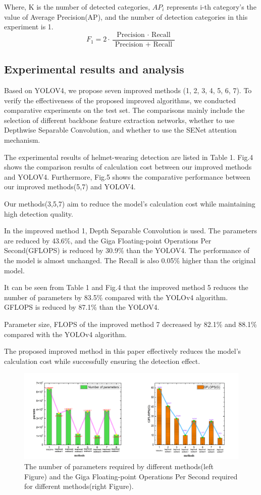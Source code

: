 \documentclass[journal]{IEEEtran}
\begin{document}
   Where, K is the number of detected categories,  $AP_{i}$ represents i-th category's the value of Average Precision(AP), and the number of detection categories in this experiment is 1.
\begin{equation}
F_{1}=2 \cdot \frac{\text { Precision } \cdot \text { Recall }}{\text { Precision }+\text { Recall }} 
\end{equation}


\subsection{Experimental results and analysis}
Based on YOLOV4, we propose seven improved methods (1, 2, 3, 4, 5, 6, 7). To verify the effectiveness of the proposed improved algorithms, we conducted comparative experiments on the test set.
The comparisons mainly include the selection of different backbone feature extraction networks, whether to use Depthwise Separable Convolution, and whether to use the SENet attention mechanism.


The experimental results of helmet-wearing detection are listed in Table 1. Fig.4 shows the comparison results of calculation cost between our improved methods and YOLOV4. Furthermore, Fig.5 shows the comparative performance between our improved methods(5,7) and YOLOV4.

Our methods(3,5,7) aim to reduce the model's calculation cost while maintaining high detection quality.


In the improved method 1, Depth Separable Convolution is used. The parameters are reduced by 43.6\%, and the Giga Floating-point Operations Per Second(GFLOPS) is reduced by 30.9\% than the YOLOV4. The performance of the model is almost unchanged. The Recall is also 0.05\% higher than the original model. 

It can be seen from Table 1 and Fig.4 that the improved method 5 reduces the number of parameters by 83.5\% compared with the YOLOv4 algorithm. GFLOPS is reduced by 87.1\% than the YOLOV4.  

Parameter size, FLOPS of the improved
method 7 decreased by 82.1\% and 88.1\%  compared with the YOLOv4 algorithm.

The proposed improved method in this paper  effectively reduces the model's calculation cost while successfully ensuring the detection effect.


\begin{figure}[h]
\centerline{\includegraphics[width=1.1\columnwidth]{QiHe4.png}}
\caption{The number of parameters required by different methods(left Figure) and the Giga Floating-point Operations Per Second required for different methods(right Figure).}
\end{figure}
\end{document}
